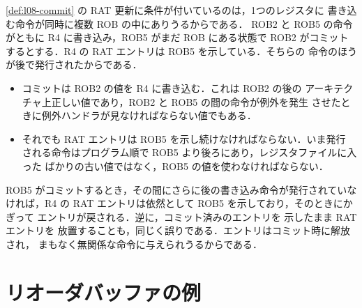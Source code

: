 \documentclass[../main.tex]{subfiles}
\begin{document}
\cref{def:l08-commit} の RAT 更新に条件が付いているのは，1つのレジスタに
書き込む命令が同時に複数 ROB の中にありうるからである．%
ROB2 と ROB5 の命令がともに R4 に書き込み，ROB5 がまだ ROB にある状態で
ROB2 がコミットするとする．R4 の RAT エントリは ROB5 を示している．そちらの
命令のほうが後で発行されたからである．
\begin{itemize}
  \item コミットは ROB2 の値を R4 に書き込む．これは ROB2 の後の
    アーキテクチャ上正しい値であり，ROB2 と ROB5 の間の命令が例外を発生
    させたときに例外ハンドラが見なければならない値でもある．
  \item それでも RAT エントリは ROB5 を示し続けなければならない．いま発行
    される命令はプログラム順で ROB5 より後ろにあり，レジスタファイルに入った
    ばかりの古い値ではなく，ROB5 の値を使わなければならない．
\end{itemize}
ROB5 がコミットするとき，その間にさらに後の書き込み命令が発行されていな
ければ，R4 の RAT エントリは依然として ROB5 を示しており，そのときにかぎって
エントリが戻される．逆に，コミット済みのエントリを
示したまま RAT エントリを
放置することも，同じく誤りである．エントリはコミット時に解放され，
まもなく無関係な命令に与えられうるからである．

\section{リオーダバッファの例}
\label{sec:l08-example}
\end{document}
